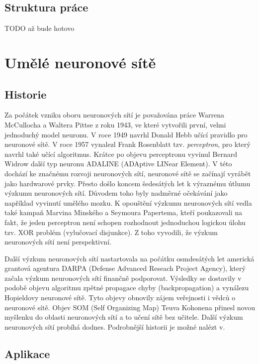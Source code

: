 \documentclass[11pt,twoside,a4paper]{book}
\begin{document}
\section{Struktura práce}
 TODO až bude hotovo

\chapter{Umělé neuronové sítě}
\section{Historie}
Za počátek vzniku oboru neuronových sítí je považována práce Warrena McCullocha a Waltera Pittse z roku 1943, ve které vytvořili první, velmi jednoduchý model neuronu. V roce 1949 navrhl Donald Hebb učící pravidlo pro neuronové sítě. V roce 1957 vynalezl Frank Rosenblatt tzv. \textit{perceptron}, pro který navrhl také učící algoritmus. Krátce po objevu perceptronu vyvinul Bernard Widrow další typ neuronu ADALINE (ADAptive LINear Element). V této dochází ke značnému rozvoji neuronových sítí, neuronové sítě se začínají vyrábět jako hardwarové prvky. Přesto došlo koncem šedesátých let k výraznému útlumu výzkumu neuronových sítí. Důvodem toho byly nadměrné očekávání jako například vyvinutí umělého mozku. K opouštění výzkumu neuronových sítí vedla také kampaň Marvina Minského a Seymoura Papertema, kteří poukazovali na fakt, že jeden perceptron není schopen rozhodnout jednoduchou logickou úlohu tzv. XOR problém (vylučovací disjunkce). Z toho vyvodili, že výzkum neuronových sítí není perspektivní.

Další výzkum neuronových sítí nastartovala na počátku osmdesátých let americká grantová agentura DARPA (Defense Advanced Reseach Project Agency), který začala výzkum neuronových sítí finančně podporovat. Výsledky se dostavily v podobě objevu algoritmu zpětné propagace chyby (backpropagation) a vynálezu Hopieldovy neuronové sítě. Tyto objevy obnovily zájem veřejnosti i vědců o neuronové sítě. Objev SOM (Self Organizing Map) Teuva Kohonena přinesl novou myšlenku do oblasti neuronových sítí a to učení sítě bez učitele. Další výzkum neuronových sítí probíhá dodnes. Podrobnější historii je možné nalézt v\cite{teoret}.

\section{Aplikace}
\end{document}
